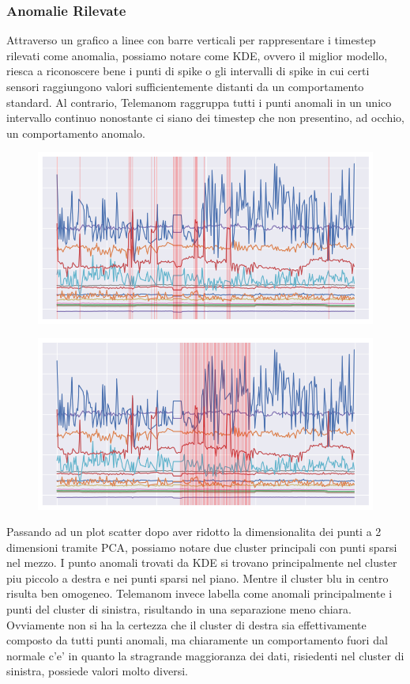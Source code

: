 \subsubsection{Anomalie Rilevate}
Attraverso un grafico a linee con barre verticali per rappresentare i timestep rilevati come anomalia, possiamo notare come KDE, ovvero il miglior modello, riesca a riconoscere bene i punti di spike o gli intervalli di spike in cui certi sensori raggiungono valori sufficientemente distanti da un comportamento standard. Al contrario, Telemanom raggruppa tutti i punti anomali in un unico intervallo continuo nonostante ci siano dei timestep che non presentino, ad occhio, un comportamento anomalo.

\begin{figure}[t]
\includegraphics[width=14cm, scale=1]{images/kde}
\centering
\end{figure}

\begin{figure}[t]
\includegraphics[width=14cm, scale=1]{images/worst_clf}
\centering
\end{figure}

Passando ad un plot scatter dopo aver ridotto la dimensionalita dei punti a 2 dimensioni tramite PCA, possiamo notare due cluster principali con punti sparsi nel mezzo. I punto anomali trovati da KDE si trovano principalmente nel cluster piu piccolo a destra e nei punti sparsi nel piano. Mentre il cluster blu in centro risulta ben omogeneo.
Telemanom invece labella come anomali principalmente i punti del cluster di sinistra, risultando in una separazione meno chiara.
Ovviamente non si ha la certezza che il cluster di destra sia effettivamente composto da tutti punti anomali, ma chiaramente un comportamento fuori dal normale c'e' in quanto la stragrande maggioranza dei dati, risiedenti nel cluster di sinistra, possiede valori molto diversi.


